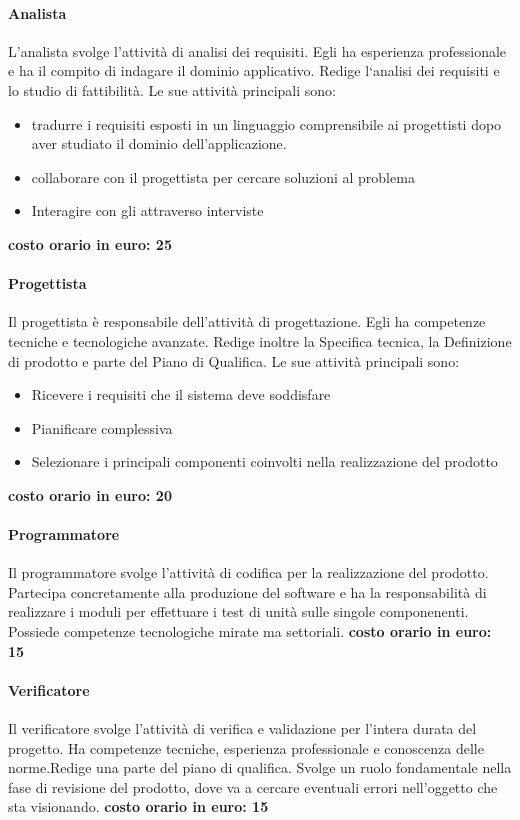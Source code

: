 \documentclass[../norme-di-progetto.tex]{subfiles}
\begin{document}
\paragraph{Analista}
\label{par:analista}
 L'analista svolge l'attività di analisi dei requisiti. Egli ha esperienza professionale e ha il compito di indagare il dominio applicativo. Redige l`analisi dei requisiti e lo studio di fattibilità. Le sue attività principali sono:
\begin{itemize}
	\item tradurre i requisiti esposti in un linguaggio comprensibile ai progettisti dopo aver studiato il dominio dell'applicazione.
	\item collaborare con il progettista per cercare soluzioni al problema
	\item Interagire con gli  attraverso interviste
\end{itemize}
\textbf{costo orario in euro: 25}
\paragraph{Progettista}
\label{par:progettista}
Il progettista è responsabile dell'attività di progettazione. Egli ha competenze tecniche e tecnologiche avanzate. Redige inoltre la Specifica tecnica, la Definizione di prodotto e parte del Piano di Qualifica. Le sue attività principali sono:
\begin{itemize}
	\item Ricevere i requisiti che il sistema deve soddisfare
	\item Pianificare  complessiva
	\item Selezionare i principali componenti coinvolti nella realizzazione del prodotto
\end{itemize}
\textbf{costo orario in euro: 20}
\paragraph{Programmatore}
\label{par:programmatore}
Il programmatore svolge l'attività di codifica per la realizzazione del prodotto. Partecipa concretamente alla produzione del software e ha la responsabilità di realizzare i moduli per effettuare i test di unità sulle singole componenenti. Possiede competenze tecnologiche mirate ma settoriali.
\newline\textbf{costo orario in euro: 15}
\paragraph{Verificatore}
\label{par:verificatore}
Il verificatore svolge l'attività di verifica e validazione per l'intera durata del progetto. Ha competenze tecniche, esperienza professionale e conoscenza delle norme.Redige una parte del piano di qualifica. Svolge un ruolo fondamentale nella fase di revisione del prodotto, dove va a cercare eventuali errori nell'oggetto che sta visionando.
\newline\textbf{costo orario in euro: 15}
\end{document}
